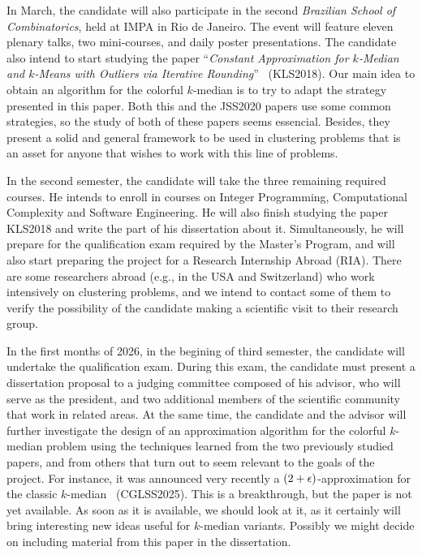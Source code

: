 \documentclass[12pt]{article}
\begin{document}
In March, the candidate will also participate in the second \emph{Brazilian School of Combinatorics}, held at IMPA in Rio de Janeiro. 
The event will feature eleven plenary talks, two mini-courses, and daily poster presentations. 
The candidate also intend to start studying the paper ``\emph{Constant Approximation for $k$-Median and $k$-Means with Outliers
via Iterative Rounding}''~\cite{KLS2018} (KLS2018). Our main idea to obtain an algorithm for the colorful $k$-median is to try to adapt the strategy presented in this paper.  Both this and the JSS2020 papers use some common strategies, so the study of both of these papers seems essencial.  Besides, they present a solid and general framework to be used in clustering problems that is an asset for anyone that wishes to work with this line of problems. 

In the second semester, the candidate will take the three remaining required courses.
He intends to enroll in courses on Integer Programming, Computational Complexity and Software Engineering. 
He will also finish studying the paper KLS2018 and write the part of his dissertation about it.
Simultaneously, he will prepare for the qualification exam required by the Master's Program, 
and will also start preparing the project for a Research Internship Abroad (RIA). 
There are some researchers abroad (e.g., in the USA and Switzerland) who work intensively on clustering problems, 
and we intend to contact some of them to verify the possibility of the candidate making a scientific visit to 
their research group.

In the first months of 2026, in the begining of third semester, the candidate will undertake the qualification exam. 
During this exam, the candidate must present a dissertation proposal to a judging committee composed of his advisor, 
who will serve as the president, and two additional members of the scientific community that work in related areas.
At the same time, the candidate and the advisor will further investigate the design of an approximation algorithm 
for the colorful $k$-median problem using the techniques learned from the two previously studied papers, 
and from others that turn out to seem relevant to the goals of the project.  For instance, it was announced 
very recently a $(2 + \epsilon)$-approximation for the classic $k$-median~\cite{CGLS2025} (CGLSS2025). 
This is a breakthrough, but the paper is not yet available. As soon as it is available, 
we should look at it, as it certainly will bring interesting new ideas useful for $k$-median variants.
Possibly we might decide on including material from this paper in the dissertation.
\end{document}

